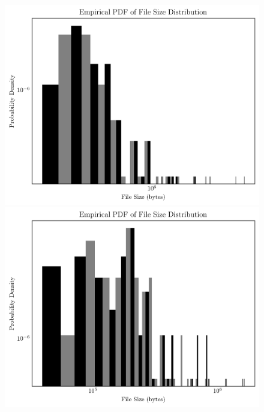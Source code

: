 \documentclass{article}
\begin{document}
\begin{figure}[htbp]
\centering

\begin{minipage}{.5\linewidth}
\centering
{}
\includegraphics[width=\linewidth]{./images/papers_size_pdf.png}
\end{minipage}%
\begin{minipage}{.5\linewidth}
\centering

\includegraphics[width=\linewidth]{./images/posters_size_pdf.png}
\end{minipage}

\end{figure}
\end{document}
